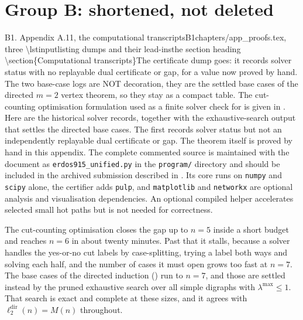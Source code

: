 \section*{Group B: shortened, not deleted}

\begin{offcutrewrite}{B1. Appendix A.11, the computational transcripts}{B1}{chapters/app\_proofs.tex, three \textbackslash{}lstinputlisting dumps and their lead-ins}{the section heading \textbackslash{}section\{Computational transcripts\}}{The certificate dump goes: it records solver status with no replayable dual certificate or gap, for a value now proved by hand. The two base-case logs are NOT decoration, they are the settled base cases of the directed $m=2$ vertex theorem, so they stay as a compact table.}
The cut-counting optimisation formulation used as a finite solver check for  is given in . Here are the historical solver records, together with the exhaustive-search output that settles the directed base cases. The first records solver status but not an independently replayable dual certificate or gap. The theorem itself is proved by hand in this appendix. The complete commented source is maintained with the document as \texttt{erdos915\_unified.py} in the \texttt{program/} directory and should be included in the archived submission described in . Its core runs on \texttt{numpy} and \texttt{scipy} alone, the certifier adds \texttt{pulp}, and \texttt{matplotlib} and \texttt{networkx} are optional analysis and visualisation dependencies. An optional compiled helper accelerates selected small hot paths but is not needed for correctness.



The cut-counting optimisation closes the gap up to $n = 5$ inside a short budget and reaches $n = 6$ in about twenty minutes. Past that it stalls, because a solver handles the yes-or-no cut labels by case-splitting, trying a label both ways and solving each half, and the number of cases it must open grows too fast at $n = 7$. The base cases of the directed induction () run to $n = 7$, and those are settled instead by the pruned exhaustive search over all simple digraphs with $\lambda^{\max} \le 1$. That search is exact and complete at these sizes, and it agrees with $\ell_2^{\mathrm{dir}}(n) = M(n)$ throughout.


\end{offcutrewrite}
